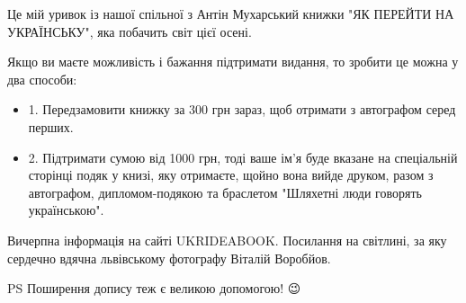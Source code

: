 Це мій уривок із нашої спільної з Антін Мухарський книжки "ЯК ПЕРЕЙТИ НА
УКРАЇНСЬКУ", яка побачить світ цієї осені.

Якщо ви маєте можливість і бажання підтримати видання, то зробити це можна у
два способи:

\begin{itemize}
\item 1. Передзамовити книжку за 300 грн зараз, щоб отримати з автографом серед перших.
\item 2. Підтримати сумою від 1000 грн, тоді ваше ім'я буде вказане на спеціальній сторінці подяк у книзі, яку отримаєте, щойно вона вийде друком, разом з автографом, дипломом-подякою та браслетом "Шляхетні люди говорять українською".
\end{itemize}

Вичерпна інформація на сайті UKRIDEABOOK. Посилання на світлині, за яку
сердечно вдячна львівському фотографу Віталій Воробйов.

PS Поширення допису теж є великою допомогою! 😉

